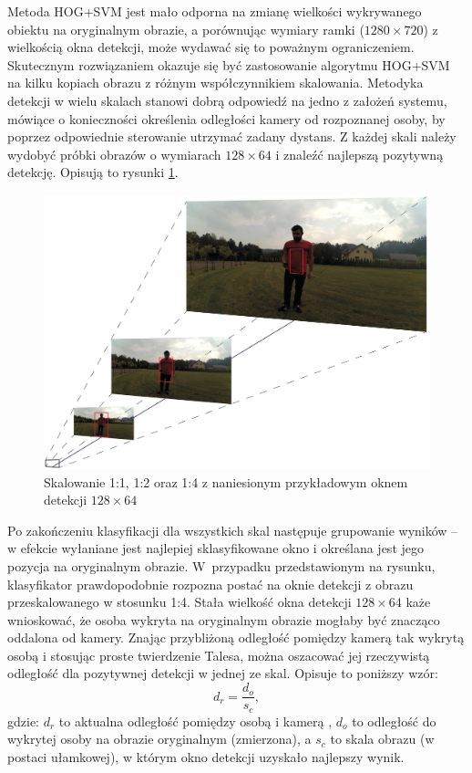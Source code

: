 Metoda HOG+SVM jest mało odporna na zmianę wielkości wykrywanego obiektu na oryginalnym obrazie, a porównując wymiary ramki ($1280\times 720$) z wielkością okna detekcji, może wydawać się to poważnym ograniczeniem. 
Skutecznym rozwiązaniem okazuje się być zastosowanie algorytmu HOG+SVM na kilku kopiach obrazu z różnym współczynnikiem skalowania. %
Metodyka detekcji w wielu skalach stanowi dobrą odpowiedź na jedno z założeń systemu, mówiące o konieczności określenia odległości kamery od rozpoznanej osoby, by poprzez odpowiednie sterowanie utrzymać zadany dystans.  %
Z każdej skali należy wydobyć próbki obrazów o wymiarach $128\times 64$ i znaleźć najlepszą pozytywną detekcję. 
Opisują to rysunki \ref{fig:HOG_scaling}. 
\begin{figure}[h]
	\centering
	\captionsetup{justification=centering,margin=1cm}
	\hspace*{0cm}
	\includegraphics[width=15.5cm]{2_scaling.jpg}
	\caption{Skalowanie 1:1, 1:2 oraz 1:4 z naniesionym przykładowym oknem detekcji $128 \times 64$}
	\label{fig:HOG_scaling}
\end{figure}

Po zakończeniu klasyfikacji dla wszystkich skal następuje grupowanie wyników -- w efekcie wyłaniane jest najlepiej sklasyfikowane okno i określana jest jego pozycja na oryginalnym obrazie. 
W~przypadku przedstawionym na rysunku, klasyfikator prawdopodobnie rozpozna postać na oknie detekcji z obrazu przeskalowanego w stosunku 1:4. Stała wielkość okna detekcji $128\times 64$ każe wnioskować, że osoba wykryta na oryginalnym obrazie mogłaby być znacząco oddalona od kamery. Znając przybliżoną odległość pomiędzy kamerą tak wykrytą osobą i stosując proste twierdzenie Talesa, można oszacować jej rzeczywistą odległość dla pozytywnej detekcji w jednej ze skal. 
Opisuje to poniższy wzór:
\begin{equation}
\label{eq:scaling}
d_r=\frac{d_o}{s_c},
\end{equation}
gdzie: $d_r$ to aktualna odległość pomiędzy osobą i kamerą , $d_o$ to odległość do wykrytej osoby na obrazie oryginalnym (zmierzona), a $s_c$ to skala obrazu (w postaci ułamkowej), w którym okno detekcji uzyskało najlepszy wynik.

